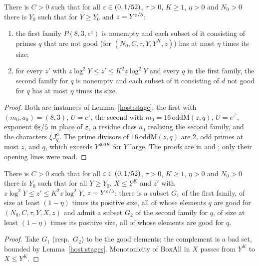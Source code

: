 \begin{lemma}\label{host:stages}
There is $C>0$ such that for all $\varepsilon\in(0,1/52)$, $\tau>0$, $K\ge1$,
$\eta>0$ and $N_0>0$ there is $Y_0$ such that for $Y\ge Y_0$ and
$z=Y^{\varepsilon/5}$:
\begin{enumerate}
\item the first family $P(8,3,e^z)$ is nonempty and each subset of it
  consisting of primes $q$ that are not good (for $(N_0,C,\tau,Y,Y^K,z)$)
  has at most $\eta$ times its size;
\item for every $z'$ with $z\log^2Y\le z'\le K^2z\log^2Y$ and every $q$ in
  the first family, the second family for $q$ is nonempty and each subset
  of it consisting of $d$ not good for $q$ has at most $\eta$ times its
  size.
\end{enumerate}
\end{lemma}
\begin{proof}
Both are instances of Lemma~\ref{host:stage}: the first with
$(m_0,a_0)=(8,3)$, $U=e^z$, the second with $m_0=16\,\mathrm{oddM}(z,q)$,
$U=e^{z'}$, exponent $6\varepsilon/5$ in place of $\varepsilon$, a residue class $a_0$
realising the second family, and the characters $\xi J_q^a$. The prime
divisors of $16\,\mathrm{oddM}(z,q)$ are $2$, odd primes at most $z$, and
$q$, which exceeds $Y^{400K}$ for $Y$ large.
The proofs are in  and
; only their opening lines were read.
\end{proof}

\begin{lemma}\label{host:pair-share}
There is $C>0$ such that for all $\varepsilon\in(0,1/52)$, $\tau>0$, $K\ge1$,
$\eta>0$ and $N_0>0$ there is $Y_0$ such that for all $Y\ge Y_0$, $X\le
Y^K$ and $z'$ with $z\log^2Y\le z'\le K^2z\log^2Y$, $z=Y^{\varepsilon/5}$: there is
a subset $G_1$ of the first family, of size at least $(1-\eta)$ times its
positive size, all of whose elements $q$ are good for $(N_0,C,\tau,Y,X,z)$
and admit a subset $G_2$ of the second family for $q$, of size at least
$(1-\eta)$ times its positive size, all of whose elements are good for $q$.
\end{lemma}
\begin{proof}
Take $G_1$ (resp.\ $G_2$) to be the good elements; the complement is a bad
set, bounded by Lemma~\ref{host:stages}. Monotonicity of $\mathrm{BoxAll}$
in $X$ passes from $Y^K$ to $X\le Y^K$.
\end{proof}

